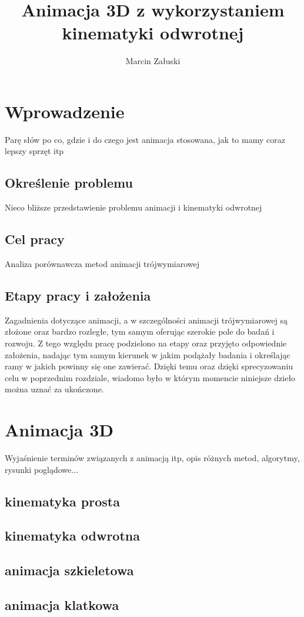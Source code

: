 \documentclass[11pt]{mwrep}
\author{Marcin Załuski}
\title{Animacja 3D z wykorzystaniem kinematyki odwrotnej}
\begin{document}
\maketitle
\tableofcontents
\chapter{Wprowadzenie}
Parę słów po co, gdzie i do czego jest animacja stosowana, jak to mamy coraz lepszy sprzęt itp
  \section{Określenie problemu}
Nieco bliższe przedstawienie problemu animacji i kinematyki odwrotnej
  \section{Cel pracy}
Analiza porównawcza metod animacji trójwymiarowej
  \section{Etapy pracy i założenia}

Zagadnienia dotyczące animacji, a w szczególności animacji trójwymiarowej są złożone oraz bardzo rozległe, tym samym oferując szerokie pole do badań i rozwoju. Z tego względu pracę podzielono na etapy oraz przyjęto odpowiednie założenia, nadając tym samym kierunek w jakim podążały badania i określając ramy w jakich powinny się one zawierać. Dzięki temu oraz dzięki sprecyzowaniu celu w poprzednim rozdziale, wiadomo było w którym momencie niniejsze dzieło można uznać za ukończone.


\chapter{Animacja 3D}
Wyjaśnienie terminów związanych z animacją itp, opis różnych metod, algorytmy, rysunki poglądowe...
  \section{kinematyka prosta}
  \section{kinematyka odwrotna}
  \section{animacja szkieletowa}
  \section{animacja klatkowa}
\end{document}
